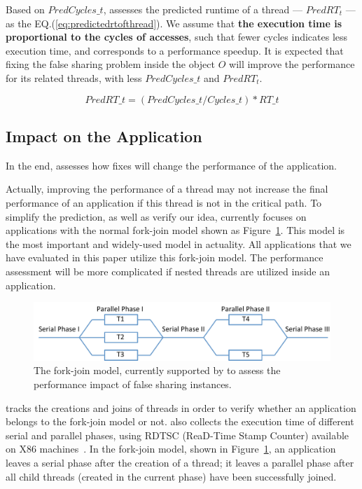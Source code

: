 Based on $PredCycles\_{t}$, \cheetah{} assesses the predicted runtime of a thread --- $PredRT_{t}$ --- as the EQ.(\ref{eq:predictedrtofthread}). We assume that {\bf the execution time is proportional to the cycles of accesses}, such that fewer cycles indicates less execution time, and corresponds to a performance speedup. It is expected that fixing the false sharing problem inside the object $O$ will improve the performance for its related threads, with less $PredCycles\_{t}$ and $PredRT_{t}$. 

\begin{equation}
\label{eq:predictedrtofthread}
 PredRT\_{t} = (PredCycles\_{t} / Cycles\_{t}) * RT\_{t} 
\end{equation} 

\subsection{Impact on the Application}
\label{sec:impactapp}

In the end, \cheetah{} assesses how fixes will change the performance of the application. 

Actually, improving the performance of a thread may not increase the final performance of an application if this thread is not in the critical path.  To simplify the prediction, as well as verify our idea, \cheetah{} currently focuses on applications with the normal fork-join model shown as Figure~\ref{fig:forkjoinmodel}. This model is the most important and widely-used model in actuality. All applications that we have evaluated in this paper utilize this fork-join model. The performance assessment will be more complicated if nested threads are utilized inside an application. 


\begin{figure}[ht!]
\begin{center}
\includegraphics[width=6in]{figure/forkjoin}
\end{center}
\caption{The fork-join model, currently supported by \Cheetah{} to assess the performance impact of false sharing instances. }
\label{fig:forkjoinmodel}
\end{figure}

\cheetah{} tracks the creations and joins of threads in order to verify whether an application belongs to the fork-join model or not. \Cheetah{} also collects the execution time of different serial and parallel phases, using RDTSC (ReaD-Time Stamp Counter) available on X86 machines~\cite{rtdsc}. In the fork-join model, shown in Figure~\ref{fig:forkjoinmodel}, an application leaves a serial phase after the creation of a thread; it leaves a parallel phase after all child threads (created in the current phase) have been successfully joined. 

